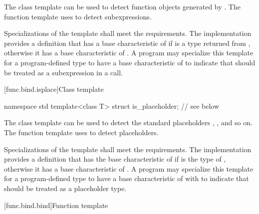 \pnum
The class template  can be used to detect function objects
generated by . The function template 
uses  to detect subexpressions.

\pnum
Specializations of the  template shall meet
the  requirements. The implementation
provides a definition that has a base characteristic of
 if  is a type returned from ,
otherwise it has a base characteristic of .
A program may specialize this template for a program-defined type 
to have a base characteristic of  to indicate that
 should be treated as a subexpression in a  call.

[func.bind.isplace]{Class template }

%
\begin{codeblock}
namespace std {
  template<class T> struct is_placeholder;      // see below
}
\end{codeblock}

\pnum
The class template  can be used to detect the standard placeholders
, , and so on. The function template  uses
 to detect placeholders.

\pnum
Specializations of the  template shall meet
the  requirements. The implementation
provides a definition that has the base characteristic of
 if  is the type of
, otherwise it has a
base characteristic of . A program
may specialize this template for a program-defined type  to
have a base characteristic of 
with  to indicate that  should be
treated as a placeholder type.

[func.bind.bind]{Function template }

